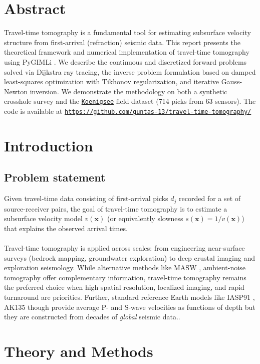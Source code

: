 \section*{Abstract}
Travel-time tomography is a fundamental tool for estimating subsurface velocity structure from first-arrival (refraction) seismic data. This report presents the theoretical framework and numerical implementation of travel-time tomography using PyGIMLi \cite{Ruecker2017}. We describe the continuous and discretized forward problems solved via Dijkstra ray tracing, the inverse problem formulation based on damped least-squares optimization with Tikhonov regularization, and iterative Gauss-Newton inversion. We demonstrate the methodology on both a synthetic crosshole survey and the \href{https://github.com/gimli-org/example-data/blob/master/traveltime/koenigsee.sgt}{\texttt{Koenigsee}} field dataset (714 picks from 63 sensors). The code is available at \href{https://github.com/guntas-13/travel-time-tomography/}{\texttt{https://github.com/guntas-13/travel-time-tomography/}}

\section*{Introduction}
\subsection*{Problem statement}
Given travel-time data consisting of first-arrival picks $d_j$ recorded for a set of source-receiver pairs, the goal of travel-time tomography is to estimate a subsurface velocity model $v(\mathbf{x})$ (or equivalently slowness $s(\mathbf{x}) = 1/v(\mathbf{x})$) that explains the observed arrival times.\\ \\
Travel-time tomography is applied across scales: from engineering near-surface surveys (bedrock mapping, groundwater exploration) to deep crustal imaging and exploration seismology. While alternative methods like MASW \cite{masw}, ambient-noise tomography \cite{ambient} offer complementary information, travel-time tomography remains the preferred choice when high spatial resolution, localized imaging, and rapid turnaround are priorities. Further, standard reference Earth models like IASP91 \cite{iasp91}, AK135 \cite{ak135} though provide average P- and S-wave velocities as functions of depth but they are constructed from decades of \textit{global} seismic data..

\section*{Theory and Methods}
